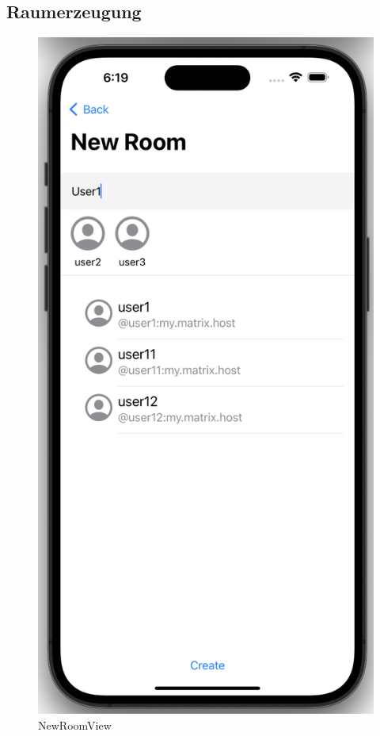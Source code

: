     \newpage
    \subsection{Raumerzeugung}

    \begin{figure}[h]
        \includegraphics[scale=0.5]{newroom}
        \centering
        \caption{NewRoomView}\label{fig:newroomview}
    \end{figure}

